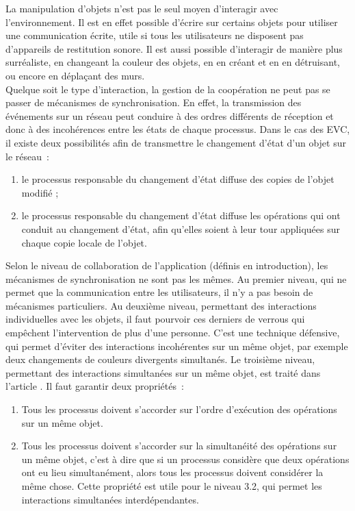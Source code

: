 \documentclass[11pt]{article}
\begin{document}
La manipulation d'objets n'est pas le seul moyen d'interagir  avec l'environnement. Il est en effet possible d'écrire sur certains objets pour utiliser une communication écrite, utile si tous les utilisateurs ne disposent pas d'appareils de restitution sonore. Il est aussi possible d'interagir de manière plus surréaliste, en changeant la couleur des objets, en en créant et en en détruisant, ou encore en déplaçant des murs.
\\

Quelque soit le type d'interaction, la gestion de la coopération ne peut pas se passer de mécanismes de synchronisation. En effet, la transmission des événements sur un réseau peut conduire à des ordres différents de réception et donc à des incohérences entre les états de chaque processus. Dans le cas des EVC, il existe deux possibilités afin de transmettre le changement d'état d'un objet sur le réseau~:
\begin{enumerate}
	\item le processus responsable du changement d'état diffuse des copies de l'objet modifié ;
	\item le processus responsable du changement d'état diffuse les opérations qui ont conduit au changement d'état, afin qu'elles soient à leur tour appliquées sur chaque copie locale de l'objet.
\end{enumerate}

Selon le niveau de collaboration de l'application (définis en introduction), les mécanismes de synchronisation ne sont pas les mêmes. Au premier niveau, qui ne permet que la communication entre les utilisateurs, il n'y a pas besoin de mécanismes particuliers. Au deuxième niveau, permettant des interactions individuelles avec les objets, il faut pourvoir ces derniers de verrous qui empêchent l'intervention de plus d'une personne. C'est une technique défensive, qui permet d'éviter des interactions incohérentes sur un même objet, par exemple deux changements de couleurs divergents simultanés. Le troisième niveau, permettant des interactions simultanées sur un même objet, est traité dans l'article \cite{margery}. Il faut garantir deux propriétés~:
\begin{enumerate}
	\item Tous les processus doivent s'accorder sur l'ordre d'exécution des opérations sur un même objet.
	\item Tous les processus doivent s'accorder sur la simultanéité des opérations sur un même objet, c'est à dire que si un processus considère que deux opérations ont eu lieu simultanément, alors tous les processus doivent considérer la même chose. Cette propriété est utile pour le niveau 3.2, qui permet les interactions simultanées interdépendantes.
\end{enumerate}
\end{document}
